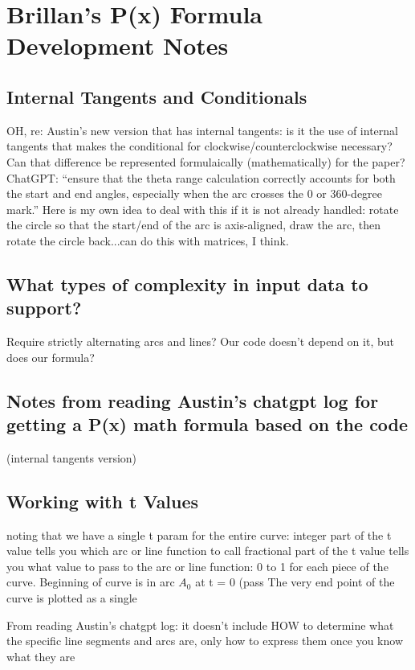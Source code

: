 \documentclass[sigconf]{acmart}
\begin{document}
\section{Brillan's P(x) Formula Development Notes}

\subsection{Internal Tangents and Conditionals}
OH, re: Austin’s new version that has internal tangents:
is it the use of internal tangents that makes the conditional for clockwise/counterclockwise necessary?
Can that difference be represented formulaically (mathematically) for the paper?
ChatGPT: “ensure that the theta range calculation correctly accounts for both the start and end angles, especially when the arc crosses the 0 or 360-degree mark.”
Here is my own idea to deal with this if it is not already handled: rotate the circle so that the start/end of the arc is axis-aligned, draw the arc, then rotate the circle back...can do this with matrices, I think.



\subsection{What types of complexity in input data to support?}
Require strictly alternating arcs and lines?
Our code doesn't depend on it, but does our formula?

\subsection{Notes from reading Austin's chatgpt log for getting a P(x) math formula based on the code}
(internal tangents version)

\subsection{Working with t Values}
noting that we have a single t param for the entire curve:
integer part of the t value tells you which arc or line function to call
fractional part of the t value tells you what value to pass to the arc or line function: 0 to 1 for each piece of the curve.
Beginning of curve is in arc $A_0$ at t = 0 (pass 
The very end point of the curve is plotted as a single 

From reading Austin's chatgpt log: it doesn't include HOW to determine what the specific line segments and arcs are, only how to express them once you know what they are
\end{document}
